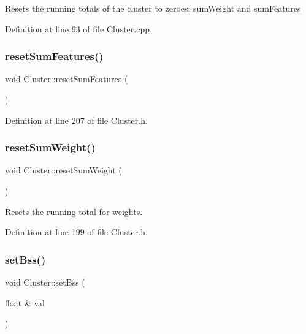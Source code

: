 Resets the running totals of the cluster to zeroes; sum\+Weight and sum\+Features 

Definition at line 93 of file Cluster.\+cpp.

\mbox{\label{class_cluster_a0ea9e78709352146e9a0f3bcb0574928}} 
\subsubsection{\texorpdfstring{reset\+Sum\+Features()}{resetSumFeatures()}}
{\footnotesize\ttfamily void Cluster\+::reset\+Sum\+Features (\begin{DoxyParamCaption}{ }\end{DoxyParamCaption})\hspace{0.3cm}{\ttfamily [inline]}}



Definition at line 207 of file Cluster.\+h.

\mbox{\label{class_cluster_a4cd75a1e9afb0d72b0d91c5549869ce1}} 
\subsubsection{\texorpdfstring{reset\+Sum\+Weight()}{resetSumWeight()}}
{\footnotesize\ttfamily void Cluster\+::reset\+Sum\+Weight (\begin{DoxyParamCaption}{ }\end{DoxyParamCaption})\hspace{0.3cm}{\ttfamily [inline]}}

Resets the running total for weights. 

Definition at line 199 of file Cluster.\+h.

\mbox{\label{class_cluster_a6d4da0772bd78a707e59d90a4a026588}} 
\subsubsection{\texorpdfstring{set\+Bss()}{setBss()}}
{\footnotesize\ttfamily void Cluster\+::set\+Bss (\begin{DoxyParamCaption}\item[{float \&}]{val }\end{DoxyParamCaption})\hspace{0.3cm}{\ttfamily [inline]}}



